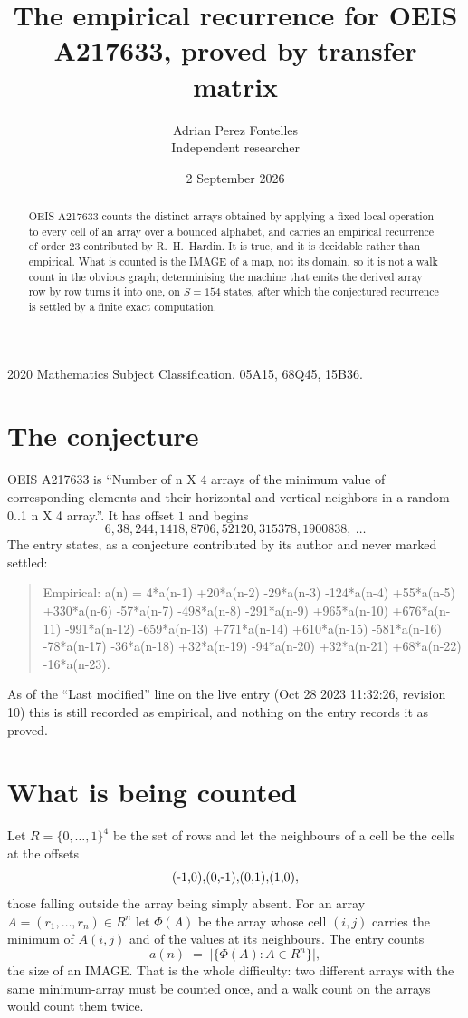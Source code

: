 \documentclass[11pt,a4paper]{article}
\title{The empirical recurrence for OEIS A217633, proved by transfer matrix}
\author{Adrian Perez Fontelles\\ \small Independent researcher}
\date{2 September 2026}
\theoremstyle{plain}
\theoremstyle{definition}
\begin{document}
\maketitle

\begin{abstract}
OEIS A217633 counts the distinct arrays obtained by applying a fixed local operation to every cell
of an array over a bounded alphabet, and carries an empirical recurrence of order $23$
contributed by R.~H.~Hardin. It is true, and it is decidable rather than empirical. What is
counted is the IMAGE of a map, not its domain, so it is not a walk count in the obvious graph;
determinising the machine that emits the derived array row by row turns it into one, on
$S=154$ states, after which the conjectured recurrence is settled by a finite exact
computation.
\end{abstract}

\noindent\small 2020 Mathematics Subject Classification. 05A15, 68Q45, 15B36.\normalsize

\section{The conjecture}

OEIS A217633 is ``Number of n X 4 arrays of the minimum value of corresponding elements and their horizontal and vertical neighbors in a random 0..1 n X 4 array.''. It has offset $1$ and begins
\[
6, 38, 244, 1418, 8706, 52120, 315378, 1900838,\ \dots
\]
The entry states, as a conjecture contributed by its author and never marked settled:
\begin{quote}
Empirical: a(n) = 4*a(n-1) +20*a(n-2) -29*a(n-3) -124*a(n-4) +55*a(n-5) +330*a(n-6) -57*a(n-7) -498*a(n-8) -291*a(n-9) +965*a(n-10) +676*a(n-11) -991*a(n-12) -659*a(n-13) +771*a(n-14) +610*a(n-15) -581*a(n-16) -78*a(n-17) -36*a(n-18) +32*a(n-19) -94*a(n-20) +32*a(n-21) +68*a(n-22) -16*a(n-23).
\end{quote}
As of the ``Last modified'' line on the live entry (Oct 28 2023 11:32:26, revision 10) this is still
recorded as empirical, and nothing on the entry records it as proved.

\section{What is being counted}

Let $R=\{0,\dots,1\}^{4}$ be the set of rows and let the neighbours of
a cell be the cells at the offsets
\[
$(-1,0)$, $(0,-1)$, $(0,1)$, $(1,0)$,
\]
those falling outside the array being simply absent. For an array
$A=(r_1,\dots,r_n)\in R^n$ let $\Phi(A)$ be the array whose cell $(i,j)$ carries the
minimum of $A(i,j)$ and of the values at its neighbours. The entry counts
\[
a(n)\;=\;\bigl|\{\Phi(A):A\in R^n\}\bigr| ,
\]
the size of an IMAGE. That is the whole difficulty: two different arrays with the same
minimum-array must be counted once, and a walk count on the arrays would count them twice.
\end{document}
